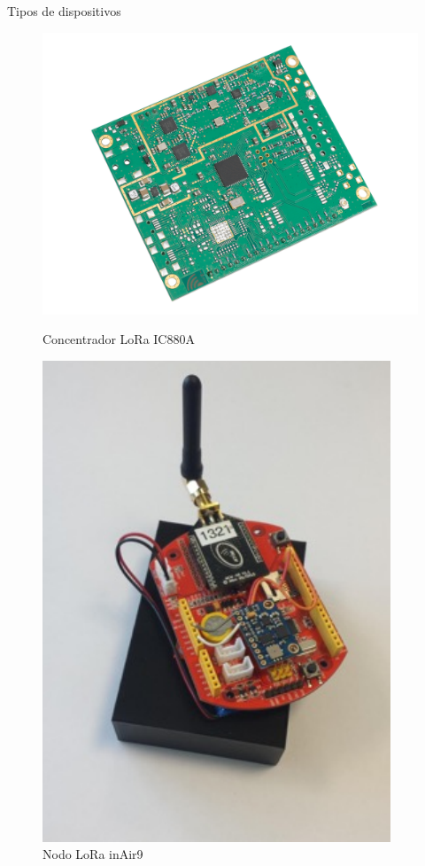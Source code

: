 \documentclass[10pt]{beamer}
\begin{document}
\begin{frame}[fragile]{Tipos de dispositivos}
\begin{figure}
\begin{overprint}
\centering\includegraphics[scale=0.2]{imagenes/concentrador}\caption{Concentrador LoRa IC880A}
\centering\includegraphics[scale=0.3]{imagenes/lora}\caption{Nodo LoRa inAir9}

\end{overprint}
\end{figure}
\end{frame}
\end{document}
